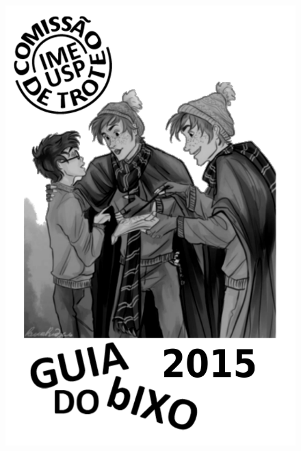 \documentclass[12pt]{report}
\begin{document}
\begin{figure}[p]
  \begin{center}
    \includegraphics[height=1.05\textheight]{img/capa_2015.pdf} %
  \end{center}
\end{figure}
\thispagestyle{empty} %
\clearpage
\newpage


\pagebreak

\renewcommand{\contentsname}{\center Esse guia contém...}
\end{document}
